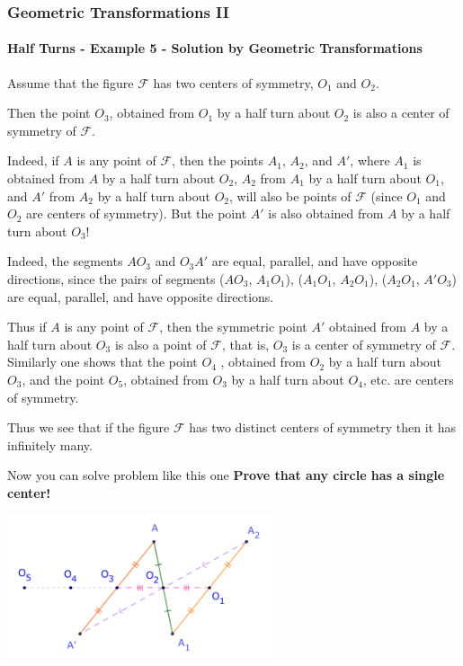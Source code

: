 \documentclass[8pt,xcolor=table,dvipsnames]{beamer}
\begin{document}
\begin{frame}[t]
    \frametitle{Geometric Transformations II}
    \framesubtitle{Half Turns - Example 5 - Solution by Geometric Transformations}
    \begin{overprint}
        Assume that the figure $\mathcal{F}$ has two centers of symmetry, $O_1$ and $O_2$.

        \bigbreak
        Then the point $O_3$, obtained from $O_1$ by a half turn about $O_2$ is also a center of symmetry of $\mathcal{F}$.

        \bigbreak
        Indeed, if $A$ is any point of $\mathcal{F}$, then the points $A_1$, $A_2$, and $A'$, where $A_1$ is obtained from $A$ by a half turn about $O_2$,
        $A_2$ from $A_1$ by a half turn about $O_1$, and $A'$ from $A_2$ by a half turn about $O_2$, will also be points of $\mathcal{F}$
        (since $O_1$ and $O_2$ are centers of symmetry).
        But the point $A'$ is also obtained from $A$ by a half turn about $O_3$!

        \bigbreak
        Indeed, the segments $AO_3$ and $O_3A'$ are equal, parallel, and have opposite directions,
        since the pairs of segments ($AO_3$, $A_1O_1$), ($A_1O_1$, $A_2O_1$), ($A_2O_1$, $A'O_3$) are equal, parallel, and have opposite directions.
    
        \bigbreak
        Thus if $A$ is any point of $\mathcal{F}$, then the symmetric point $A'$ obtained from $A$ by a half turn about $O_3$ is also a point of $\mathcal{F}$,
        that is, $O_3$ is a center of symmetry of $\mathcal{F}$.
        Similarly one shows that the point $O_4$ , obtained from $O_2$ by a half turn about $O_3$, and the point $O_5$,
        obtained from $O_3$ by a half turn about $O_4$, etc. are centers of symmetry. 
        
        \bigbreak
        Thus we see that if the figure $\mathcal{F}$ has two distinct centers of symmetry then it has infinitely many.

        \bigbreak
        Now you can solve problem like this one \textbf{Prove that any circle has a single center!}
    \end{overprint}
    \begin{center}
        \includegraphics[width=8cm]{./svg/pdf/rotation-9b.pdf}
    \end{center}
\end{frame}
\end{document}
